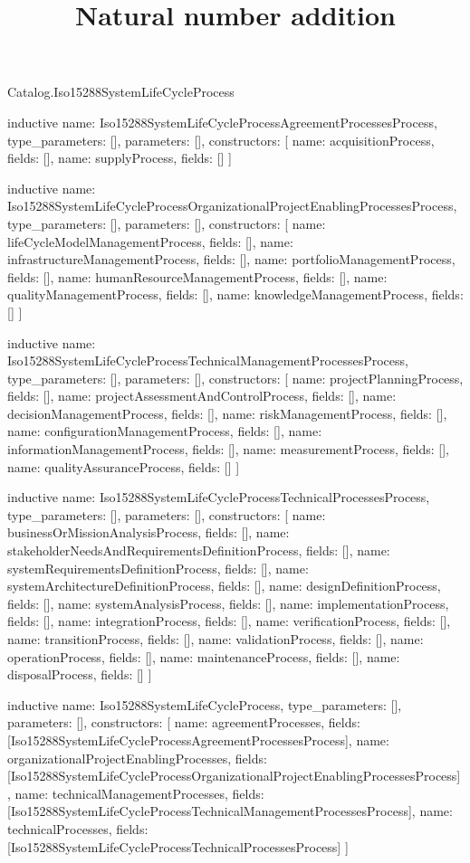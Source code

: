 \begin{lexlean}{Catalog.Iso15288SystemLifeCycleProcess}
\title{Natural number addition}
\begin{semanticmodule}
inductive{
  name: Iso15288SystemLifeCycleProcessAgreementProcessesProcess,
  type_parameters: [],
  parameters: [],
  constructors: [
    {name: acquisitionProcess, fields: []},
    {name: supplyProcess, fields: []}
  ]
}

inductive{
  name: Iso15288SystemLifeCycleProcessOrganizationalProjectEnablingProcessesProcess,
  type_parameters: [],
  parameters: [],
  constructors: [
    {name: lifeCycleModelManagementProcess, fields: []},
    {name: infrastructureManagementProcess, fields: []},
    {name: portfolioManagementProcess, fields: []},
    {name: humanResourceManagementProcess, fields: []},
    {name: qualityManagementProcess, fields: []},
    {name: knowledgeManagementProcess, fields: []}
  ]
}

inductive{
  name: Iso15288SystemLifeCycleProcessTechnicalManagementProcessesProcess,
  type_parameters: [],
  parameters: [],
  constructors: [
    {name: projectPlanningProcess, fields: []},
    {name: projectAssessmentAndControlProcess, fields: []},
    {name: decisionManagementProcess, fields: []},
    {name: riskManagementProcess, fields: []},
    {name: configurationManagementProcess, fields: []},
    {name: informationManagementProcess, fields: []},
    {name: measurementProcess, fields: []},
    {name: qualityAssuranceProcess, fields: []}
  ]
}

inductive{
  name: Iso15288SystemLifeCycleProcessTechnicalProcessesProcess,
  type_parameters: [],
  parameters: [],
  constructors: [
    {name: businessOrMissionAnalysisProcess, fields: []},
    {name: stakeholderNeedsAndRequirementsDefinitionProcess, fields: []},
    {name: systemRequirementsDefinitionProcess, fields: []},
    {name: systemArchitectureDefinitionProcess, fields: []},
    {name: designDefinitionProcess, fields: []},
    {name: systemAnalysisProcess, fields: []},
    {name: implementationProcess, fields: []},
    {name: integrationProcess, fields: []},
    {name: verificationProcess, fields: []},
    {name: transitionProcess, fields: []},
    {name: validationProcess, fields: []},
    {name: operationProcess, fields: []},
    {name: maintenanceProcess, fields: []},
    {name: disposalProcess, fields: []}
  ]
}

inductive{
  name: Iso15288SystemLifeCycleProcess,
  type_parameters: [],
  parameters: [],
  constructors: [
    {name: agreementProcesses, fields: [Iso15288SystemLifeCycleProcessAgreementProcessesProcess]},
    {name: organizationalProjectEnablingProcesses, fields: [Iso15288SystemLifeCycleProcessOrganizationalProjectEnablingProcessesProcess]},
    {name: technicalManagementProcesses, fields: [Iso15288SystemLifeCycleProcessTechnicalManagementProcessesProcess]},
    {name: technicalProcesses, fields: [Iso15288SystemLifeCycleProcessTechnicalProcessesProcess]}
  ]
}
\end{semanticmodule}
\end{lexlean}
